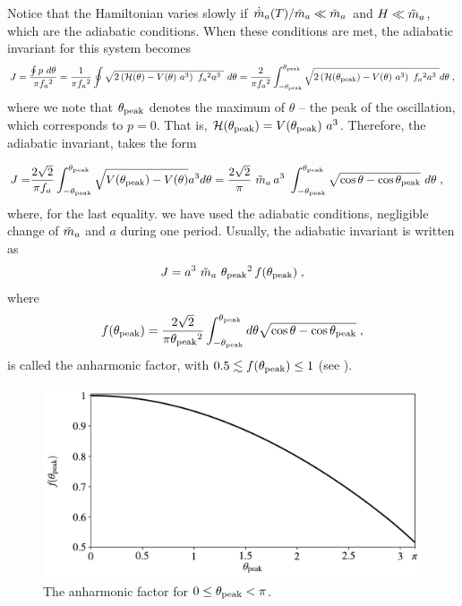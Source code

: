 \documentclass[11pt,a4paper]{article}
\begin{document}
Notice that the Hamiltonian varies slowly if $\dot {\tilde{m}}_{a}(T)/\tilde m_{a}{} \ll \tilde m_{a}{}$ and $H \ll \tilde m_{a}{}$, which are the adiabatic conditions.  When these conditions are met, the adiabatic invariant for this system becomes
%
\begin{equation}
	J = \dfrac{\oint p \ d \theta}{\pi f_{a}{}^2} = \dfrac{1}{\pi f_{a}{}^2} \oint \sqrt{ 2\left(  \mathcal{H}(\theta) - V(\theta) \ a^3 \right) \ f_{a}{}^2 a^3 \ }  \ d \theta  =
	 \dfrac{2}{\pi f_{a}{}^2} \int_{-\theta_{\rm peak}{}}^{\theta_{\rm peak}{}} \sqrt{ 2\left(  \mathcal{H}(\theta_{\rm peak}{}) - V(\theta) \ a^3 \right) \ f_{a}{}^2 a^3 \ } d \theta \;,
	 \label{eq:J_axion_definition}
\end{equation}
%
where we note that $\theta_{\rm peak}{}$ denotes the maximum of $\theta$ -- the peak of the oscillation, which corresponds to $p=0$. That is, $\Ham(\thetamax) = V(\thetamax) \ a^3$. Therefore, the adiabatic invariant, takes the form 

\begin{eqnarray}
	J=&  \dfrac{2 \sqrt{2} }{\pi f_{a}{}}  \int_{- \theta_{\rm peak}{}} ^{\theta_{\rm peak}{}}  \sqrt{ V(\theta_{\rm peak}{}) - V(\theta) } a^{3} d \theta = 
	\dfrac{2 \sqrt{2} }{\pi} \ \tilde m_{a}{} \, a^3 \ \displaystyle \int_{- \theta_{\rm peak}{}}^{\theta_{\rm peak}{}} \sqrt{\cos \theta - \cos \theta_{\rm peak}{}} \ d \theta  
	\;,
	\label{eq:J_axion_derivation}
\end{eqnarray}
%
where, for the last equality. we have used the adiabatic conditions, \ie negligible change of $\tilde m_{a}{}$ and $a$ during one period. Usually, the adiabatic invariant is written as~\cite{Lyth:1991ub,Bae:2008ue} 
%
\begin{equation}
	J = a^3 \ \tilde m_{a}{} \ \theta_{\rm peak}{}^2  \, f(\theta_{\rm peak}{})  \;,
	\label{eq:J_axion_final_form}
\end{equation}
%
where 
\begin{equation}
	f(\theta_{\rm peak}{}) =\dfrac{ 2 \sqrt{2}}{\pi \theta_{\rm peak}{}^2 } \displaystyle \int_{- \theta_{\rm peak}{}}^{\theta_{\rm peak}{}} d \theta \sqrt{ \cos \theta - \cos \theta_{\rm peak}{} } \;,
	\label{eq:anharmonic_f}
\end{equation}
%
is called the anharmonic factor, with $ 0.5 \lesssim f(\theta_{\rm peak}{}) \leq 1$ (see ).


\begin{figure}[t]
	\includegraphics[width=1\textwidth]{anharmonic_factor.pdf}
	\caption{The anharmonic factor for $0 \leq \theta_{\rm peak}{} < \pi $.}
	\label{fig:anharmonic_factor}
\end{figure}
\end{document}
